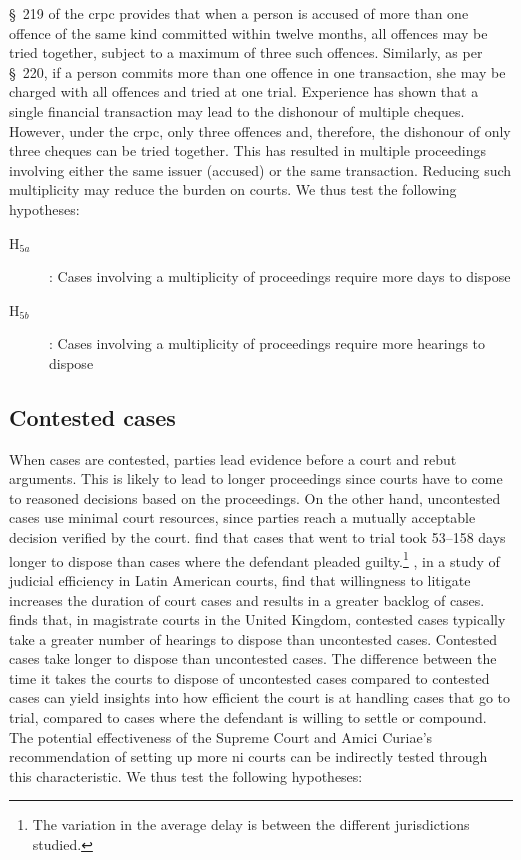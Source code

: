 \documentclass[12pt,a4paper]{article}
\begin{document}
\S~219 of the \gls{crpc} provides that when a person is accused of more than one offence of the same kind committed within twelve months, all offences may be tried together, subject to a maximum of three such offences. Similarly, as per \S~220, if a person commits more than one offence in one transaction, she may be charged with all offences and tried at one trial. Experience has shown that a single financial transaction may lead to the dishonour of multiple cheques. However, under the \gls{crpc}, only three offences and, therefore, the dishonour of only three cheques can be tried together. This has resulted in multiple proceedings involving either the same issuer (accused) or the same transaction. Reducing such multiplicity may reduce the burden on courts. We thus test the following hypotheses:

\begin{description}
\item[H$_{5a}$]: Cases involving a multiplicity of proceedings require more days to dispose
\item[H$_{5b}$]: Cases involving a multiplicity of proceedings require more hearings to dispose
\end{description}

\subsection{Contested cases}
\label{sec:contested_cases_meth}
When cases are contested, parties lead evidence before a court and rebut arguments. This is likely to lead to longer proceedings since courts have to come to reasoned decisions based on the proceedings. On the other hand, uncontested cases use minimal court resources, since parties reach a mutually acceptable decision verified by the court. \textcite{ostrom2000efficiency} find that cases that went to trial took 53--158 days longer to dispose than cases where the defendant pleaded guilty.\footnote{The variation in the average delay is between the different jurisdictions studied.} \textcite{buscaglia1997_latinAmericaCourtDelays}, in a study of judicial efficiency in Latin American courts, find that willingness to litigate increases the duration of court cases and results in a greater backlog of cases. \textcite{crownProsecutionService2006_magistrateCourtEfficiency} finds that, in magistrate courts in the United Kingdom, contested cases typically take a greater number of hearings to dispose than uncontested cases. Contested cases take longer to dispose than uncontested cases. The difference between the time it takes the courts to dispose of uncontested cases compared to contested cases can yield insights into how efficient the court is at handling cases that go to trial, compared to cases where the defendant is willing to settle or compound. The potential effectiveness of the Supreme Court and Amici Curiae's recommendation of setting up more \gls{ni} courts can be indirectly tested through this characteristic. We thus test the following hypotheses:
\end{document}
